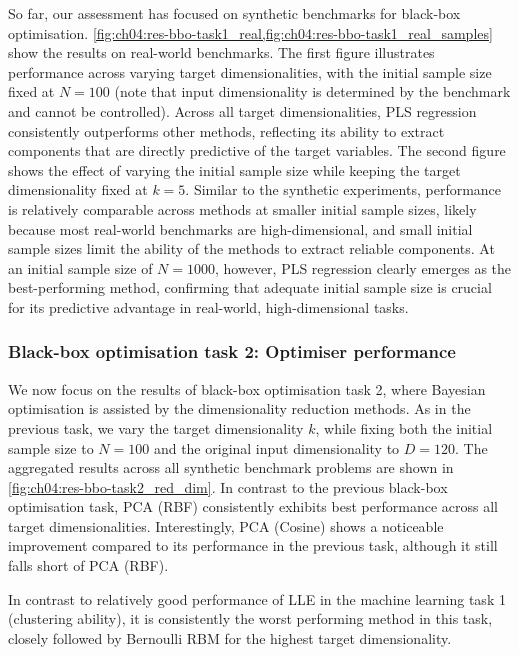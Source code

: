 So far, our assessment has focused on synthetic benchmarks for black-box optimisation. \cref{fig:ch04:res-bbo-task1_real,fig:ch04:res-bbo-task1_real_samples} show the results on real-world benchmarks. The first figure illustrates performance across varying target dimensionalities, with the initial sample size fixed at $N = 100$ (note that input dimensionality is determined by the benchmark and cannot be controlled). Across all target dimensionalities, PLS regression consistently outperforms other methods, reflecting its ability to extract components that are directly predictive of the target variables.
The second figure shows the effect of varying the initial sample size while keeping the target dimensionality fixed at $k = 5$. Similar to the synthetic experiments, performance is relatively comparable across methods at smaller initial sample sizes, likely because most real-world benchmarks are high-dimensional, and small initial sample sizes limit the ability of the methods to extract reliable components. At an initial sample size of $N = 1000$, however, PLS regression clearly emerges as the best-performing method, confirming that adequate initial sample size is crucial for its predictive advantage in real-world, high-dimensional tasks.


\subsubsection*{Black-box optimisation task 2: Optimiser performance}

We now focus on the results of black-box optimisation task 2, where Bayesian optimisation is assisted by the dimensionality reduction methods. As in the previous task, we vary the target dimensionality $k$, while fixing both the initial sample size to $N = 100$ and the original input dimensionality to $D = 120$. The aggregated results across all synthetic benchmark problems are shown in \cref{fig:ch04:res-bbo-task2_red_dim}.
In contrast to the previous black-box optimisation task, PCA (RBF) consistently exhibits best performance across all target dimensionalities. Interestingly, PCA (Cosine) shows a noticeable improvement compared to its performance in the previous task, although it still falls short of PCA (RBF).

In contrast to relatively good performance of LLE in the machine learning task 1 (clustering ability), it is consistently the worst performing method in this task, closely followed by Bernoulli RBM for the highest target dimensionality.



